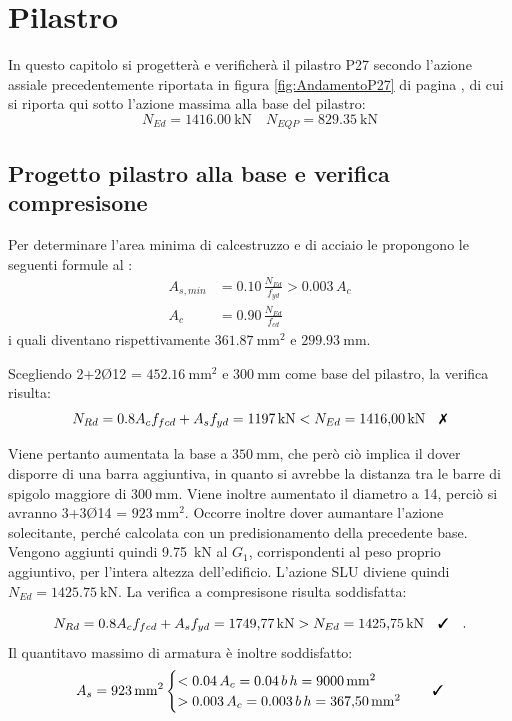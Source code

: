\chapter{Pilastro}

In questo capitolo si progetterà e verificherà il pilastro P27 secondo l'azione assiale precedentemente riportata in figura \ref{fig:AndamentoP27} di pagina \pageref{fig:AndamentoP27}, di cui si riporta qui sotto l'azione massima alla base del pilastro:
\begin{equation}
    N_{Ed} = \SI{1416.00}{\kilo\newton} \quad N_{EQP} = \SI{829.35}{\kilo\newton}
\end{equation}
\section{Progetto pilastro alla base e verifica compresisone}
Per determinare l'area minima di calcestruzzo e di acciaio le  propongono le seguenti formule al :
\begin{align}
    A_{s,min} &= 0.10\,\frac{N_{Ed}}{f_{yd}}  > 0.003 \, A_c \\
    A_c &= 0.90\,\frac{N_{Ed}}{f_{cd}}
\end{align}
i quali diventano rispettivamente $\SI{361.87}{\milli\metre\squared}$ e $\SI{299.93}{\milli\metre}$.

Scegliendo 2+2Ø12 = $\SI{452.16}{\milli\metre\squared}$ e  $\SI{300}{\milli\metre}$ come base del pilastro, la verifica risulta:
\begin{equation}
    N_{Rd} = 0.8 A_c f_{fcd} + A_s f_{yd} = \SI{1197}{\kilo\newton} < N_{Ed} = \SI{1416.00}{\kilo\newton} \quad \notchecked
\end{equation}

Viene pertanto aumentata la base a $\SI{350}{\milli\metre}$, che però ciò implica il dover disporre di una barra aggiuntiva, in quanto si avrebbe la distanza tra le barre di spigolo maggiore di $\SI{300}{\milli\metre}$.
Viene inoltre aumentato il diametro a 14, perciò si avranno 3+3Ø14 = $\SI{923}{\milli\metre\squared}$.
Occorre inoltre dover aumantare l'azione solecitante, perché calcolata con un predisionamento della precedente base. Vengono aggiunti quindi \SI{9.75}{\kilo\newton} al $G_1$, corrispondenti al peso proprio aggiuntivo, per l'intera altezza dell'edificio.
L'azione SLU diviene quindi $N_{Ed} = \SI{1425.75}{\kilo\newton}$. 
La verifica a compresisone risulta soddisfatta:

\begin{equation}
    N_{Rd} = 0.8 A_c f_{fcd} + A_s f_{yd} = \SI{1749.77}{\kilo\newton} > N_{Ed} = \SI{1425.75}{\kilo\newton} \quad \checked \quad .
\end{equation}
Il quantitavo massimo di armatura è inoltre soddisfatto:
\begin{equation}
    A_s =
      \SI{923}{\milli\metre\squared} 
    \begin{cases}
      < 0.04 \, A_c = 0.04 \, b \, h = \SI{9000}{\milli\metre\squared} \\
      > 0.003 \, A_c = 0.003 \, b \, h = \SI{367.50}{\milli\metre\squared}
    \end{cases}
    \quad \checked
  \end{equation}

